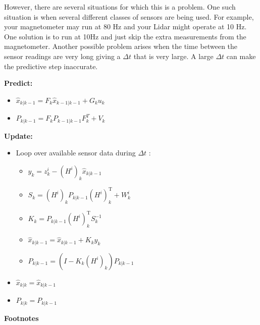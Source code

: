 However, there are several situations for which this is a problem. One
such situation is when several different classes of sensors are being
used. For example, your magnetometer may run at 80 Hz and your Lidar
might operate at 10 Hz. One solution is to run at 10Hz and just skip the
extra measurements from the magnetometer. Another possible problem
arises when the time between the sensor readings are very long giving a
\(\Delta t\) that is very large. A large \(\Delta t\) can make the
predictive step inaccurate.

\textbf{Predict:}

\begin{itemize}
\tightlist
\item
  \(\hat{x}_{k|k-1} = F_{k}\hat{x}_{k-1|k-1} + G_{k} u_{k}\)
\item
  \(P_{k|k-1} = F_{k} P_{k-1|k-1} F_{k}^{T} + V_{k}\)
\end{itemize}

\textbf{Update:}

\begin{itemize}
\tightlist
\item
  Loop over available sensor data during \(\Delta t\) :

  \begin{itemize}
  \tightlist
  \item
    \(y_k = z_k^i - (H^i)_k\hat{x}_{k|k-1}\)
  \item
    \(S_k = (H^i)_k P_{k|k-1} (H^i)_k^\text{T} + W_k^i\)
  \item
    \(K_k = P_{k|k-1}(H^i)_k^\text{T}S_k^{-1}\)
  \item
    \(\hat{x}_{k|k-1} = \hat{x}_{k|k-1} + K_k y_k\)
  \item
    \(P_{k|k-1} = (I - K_k (H^i)_k) P_{k|k-1}\)
  \end{itemize}
\item
  \(\hat{x}_{k|k} = \hat{x}_{k|k-1}\)
\item
  \(P_{k|k} = P_{k|k-1}\)
\end{itemize}

\textbf{Footnotes}
